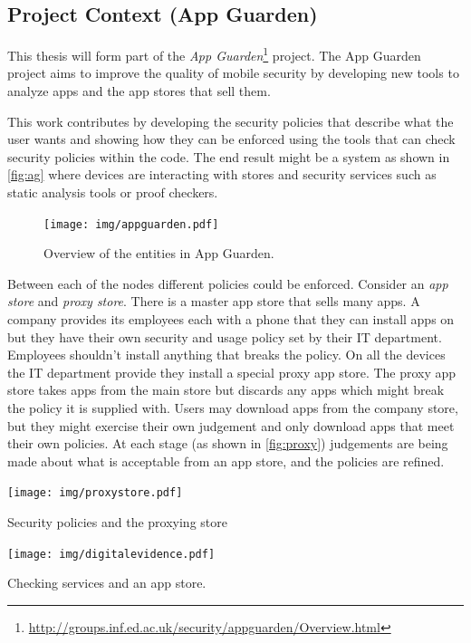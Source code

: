 \documentclass[a4paper,sfsidenotes]{%
  scrartcl%
}
\begin{document}
\subsection{Project Context (App Guarden)}

This thesis will form part of the \emph{App
Guarden}\footnote{\url{http://groups.inf.ed.ac.uk/security/appguarden/Overview.html}}
project.  The App Guarden project aims to improve the quality of mobile security
by developing new tools to analyze apps and the app stores that sell them.

This work contributes by developing the security policies that describe what the
user wants and showing how they can be enforced using the tools that can check
security policies within the code.  The end result might be a system as shown in
\autoref{fig:ag} where devices are interacting with stores and security
services such as static analysis tools or proof checkers. 

\begin{figure}
  \texttt{[image: img/appguarden.pdf]}
  \caption{Overview of the entities in App Guarden.}
\label{fig:ag}
\end{figure}

Between each of the nodes different policies could be enforced.  Consider an
\emph{app store} and \emph{proxy store}.  There is a master app store that sells
many apps.  A company provides its employees each with a phone that they can
install apps on but they have their own security and usage policy set by their
IT department.  Employees shouldn't install anything that breaks the policy. On
all the devices the IT department provide they install a special proxy app
store.  The proxy app store takes apps from the main store but discards any apps
which might break the policy it is supplied with.  Users may download apps from
the company store, but they might exercise their own judgement and only download
apps that meet their own policies.  At each stage (as shown in
\autoref{fig:proxy}) judgements are being made about what is acceptable from
an app store, and the policies are refined.

\begin{marginfigure}
  \texttt{[image: img/proxystore.pdf]}
  \caption{Security policies and the proxying store}
  \label{fig:proxy}
\end{marginfigure}

\begin{marginfigure}
  \texttt{[image: img/digitalevidence.pdf]}
  \caption{Checking services and an app store.}
  \label{fig:de}
\end{marginfigure}
\end{document}
